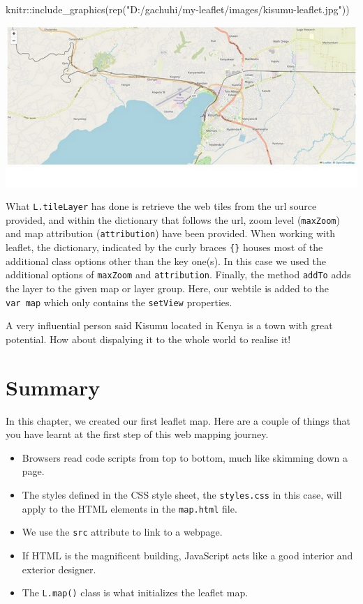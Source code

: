 \documentclass[
]{book}
\newenvironment{Shaded}{\begin{snugshade}}{\end{snugshade}}
\newcommand{\FunctionTok}[1]{\textcolor[rgb]{0.00,0.00,0.00}{#1}}
\newcommand{\NormalTok}[1]{#1}
\newcommand{\SpecialCharTok}[1]{\textcolor[rgb]{0.00,0.00,0.00}{#1}}
\newcommand{\StringTok}[1]{\textcolor[rgb]{0.31,0.60,0.02}{#1}}
\begin{document}
\begin{Shaded}
\begin{Highlighting}[]
\NormalTok{knitr}\SpecialCharTok{::}\FunctionTok{include\_graphics}\NormalTok{(}\FunctionTok{rep}\NormalTok{(}\StringTok{"D:/gachuhi/my{-}leaflet/images/kisumu{-}leaflet.jpg"}\NormalTok{))}
\end{Highlighting}
\end{Shaded}

\includegraphics[width=11.11in]{../images/kisumu-leaflet}

What \texttt{L.tileLayer} has done is retrieve the web tiles from the url source provided, and within the dictionary that follows the url, zoom level (\texttt{maxZoom}) and map attribution (\texttt{attribution}) have been provided. When working with leaflet, the dictionary, indicated by the curly braces \texttt{\{\}} houses most of the additional class options other than the key one(s). In this case we used the additional options of \texttt{maxZoom} and \texttt{attribution}. Finally, the method \texttt{addTo} adds the layer to the given map or layer group. Here, our webtile is added to the \texttt{var\ map} which only contains the \texttt{setView} properties.

A very influential person said Kisumu located in Kenya is a town with great potential. How about dispalying it to the whole world to realise it!

\hypertarget{summary-1}{%
\section{Summary}\label{summary-1}}

In this chapter, we created our first leaflet map. Here are a couple of things that you have learnt at the first step of this web mapping journey.

\begin{itemize}
\item
  Browsers read code scripts from top to bottom, much like skimming down a page.
\item
  The styles defined in the CSS style sheet, the \texttt{styles.css} in this case,
  will apply to the HTML elements in the \texttt{map.html} file.
\item
  We use the \texttt{src} attribute to link to a webpage.
\item
  If HTML is the magnificent building, JavaScript acts like a good interior and exterior designer.
\item
  The \texttt{L.map()} class is what initializes the leaflet map.
\end{itemize}
\end{document}
